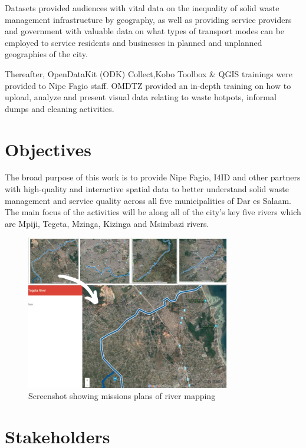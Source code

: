 \documentclass[a4paper,12pt,twoside]{article}
\begin{document}
    Datasets provided audiences with vital data on the inequality of solid waste management infrastructure by geography, as well as providing service providers and government with valuable data on what types of transport modes can be employed to service residents and businesses in planned and unplanned geographies of the city.  
    
    Thereafter, OpenDataKit (ODK) Collect,Kobo Toolbox & QGIS trainings were provided to Nipe Fagio staff. OMDTZ provided an in-depth training on how to upload, analyze and present visual data relating to waste hotpots, informal dumps and cleaning activities.


\newpage
\section{Objectives}

    The broad purpose of this work is to provide Nipe Fagio, I4ID and other partners with high-quality and interactive spatial data to better understand solid waste management and service quality across all five municipalities of Dar es Salaam. The main focus of the activities will be along all of the city’s key five rivers which are Mpiji, Tegeta, Mzinga, Kizinga and Msimbazi rivers. 

        \begin{figure}%
            \centering
            \includegraphics[width=0.8\textwidth]{images/image14.jpg}
            \caption{Screenshot showing missions plans of river mapping}
        \end{figure}

\section{Stakeholders}
\end{document}
